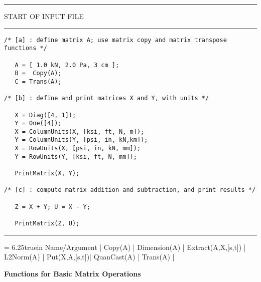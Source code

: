 \vspace{0.15 in}
\begin{footnotesize}
\noindent
{\rule{2.3 in}{0.035 in} START OF INPUT FILE \rule{2.3 in}{0.035 in} }
\begin{verbatim}
/* [a] : define matrix A; use matrix copy and matrix transpose functions */

   A = [ 1.0 kN, 2.0 Pa, 3 cm ];
   B =  Copy(A);
   C = Trans(A);

/* [b] : define and print matrices X and Y, with units */

   X = Diag([4, 1]);
   Y = One([4]);
   X = ColumnUnits(X, [ksi, ft, N, m]);
   Y = ColumnUnits(Y, [psi, in, kN,km]);
   X = RowUnits(X, [psi, in, kN, mm]);
   Y = RowUnits(Y, [ksi, ft, N, mm]);

   PrintMatrix(X, Y);

/* [c] : compute matrix addition and subtraction, and print results */

   Z = X + Y; U = X - Y;

   PrintMatrix(Z, U);
\end{verbatim}
\noindent
\rule{6.25 in}{0.035 in}
\end{footnotesize}

\begin{table}[t]
\tablewidth = 6.25truein
\begintable
Name/Argument |                                      \crthick
Copy(A)       |                           \cr
Dimension(A)  |                            \cr
Extract(A,X,[s,t]) |                  \cr
L2Norm(A)     |      \cr
Put(X,A,[s,t])|  \cr
QuanCast(A)   |                      \cr
Trans(A)      |                 
\endtable
\vspace{0.01 in}
\caption{\bf Functions for Basic Matrix Operations}
\label{tab: my-basic-matrix-operations}
\end{table}

